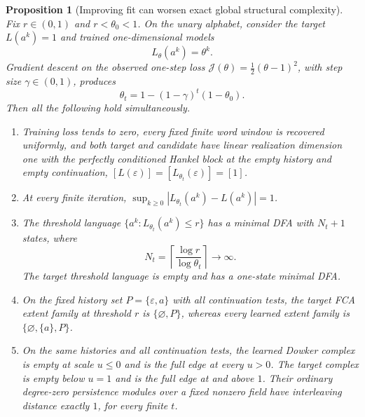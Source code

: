 \documentclass[11pt]{article}
\newtheorem{proposition}[theorem]{Proposition}
\theoremstyle{definition}\newtheorem{definition}[theorem]{Definition}
\theoremstyle{remark}\newtheorem{remark}[theorem]{Remark}
\begin{document}
\begin{proposition}[Improving fit can worsen exact global structural complexity]
\label{cl:obstruction}
Fix $r\in(0,1)$ and $r<\theta_0<1$. On the unary alphabet,
consider the target $L(a^k)=1$ and trained one-dimensional models
\[
 L_\theta(a^k)=\theta^k.
\]
Gradient descent on the observed one-step loss
$\mathcal J(\theta)=\tfrac12(\theta-1)^2$, with step size
$\gamma\in(0,1)$, produces
\[
 \theta_t=1-(1-\gamma)^t(1-\theta_0).
\]
Then all the following hold simultaneously.
\begin{enumerate}
\item Training loss tends to zero, every fixed finite word window is
recovered uniformly, and both target and candidate have linear
realization dimension one with the perfectly conditioned Hankel
block at the empty history and empty continuation, $[L(\varepsilon)]
=[L_{\theta_t}(\varepsilon)]=[1]$.
\item At every finite iteration,
$\sup_{k\geq0}|L_{\theta_t}(a^k)-L(a^k)|=1$.
\item The threshold language
$\{a^k:L_{\theta_t}(a^k)\leq r\}$ has a minimal DFA with
$N_t+1$ states, where
\[
 N_t=\left\lceil\frac{\log r}{\log\theta_t}\right\rceil
 \longrightarrow\infty.
\]
The target threshold language is empty and has a one-state minimal DFA.
\item On the fixed history set $P=\{\varepsilon,a\}$ with
\emph{all} continuation tests, the target FCA extent family at
threshold $r$ is $\{\varnothing,P\}$, whereas every learned extent
family is $\{\varnothing,\{a\},P\}$.
\item On the same histories and all continuation tests, the learned
Dowker complex is empty at scale $u\leq0$ and is the full edge at
every $u>0$. The target complex is empty below $u=1$ and is the full
edge at and above $1$. Their ordinary degree-zero persistence
modules over a fixed nonzero field have interleaving distance exactly $1$,
for every finite $t$.
\end{enumerate}
\end{proposition}
\end{document}
